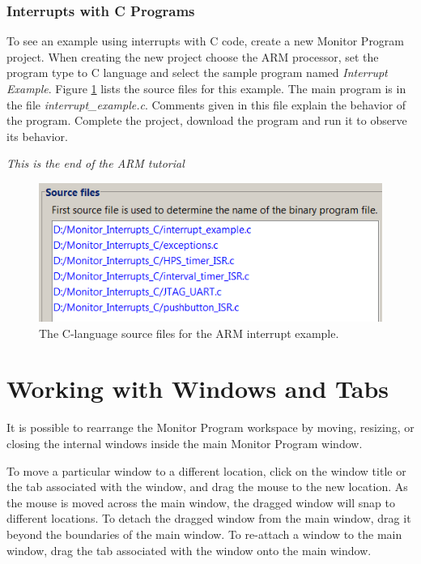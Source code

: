 \documentclass[11pt, twoside, pdftex]{article}
\begin{document}
\newpage
\subsubsection{Interrupts with C Programs}

To see an example using interrupts with C code, 
create a new Monitor Program project.
When creating the new project choose the ARM processor,
set the program type to C language and select the sample
program named {\it Interrupt Example}. 
Figure \ref{fig:NPW_interrupts_c_sourcefiles_arm} lists the source files for this example.
The main program is in the file {\it interrupt\_example.c}.
Comments given in this file explain the behavior of the program.
Complete the project, download the program and run it to
observe its behavior.

{\it This is the end of the ARM tutorial}

\begin{figure}[H]
   \begin{center}
      \includegraphics[scale=1]{screenshots/figure58.png}
   \end{center}
   \caption{The C-language source files for the ARM interrupt example.} 
   \label{fig:NPW_interrupts_c_sourcefiles_arm}
\end{figure}


\section{Working with Windows and Tabs}

It is possible to rearrange the Monitor Program workspace by
moving, resizing, or closing the internal windows inside the main
Monitor Program window.

To move a particular window to a different location, click on the
window title or the tab associated with the window, and drag the
mouse to the new location. As the mouse is moved across the main
window, the dragged window will snap to different locations. 
To detach the dragged window from the main window, drag it beyond
the boundaries of the main window. 
To re-attach a window to the main window, drag the tab associated
with the window onto the main window.
\end{document}
